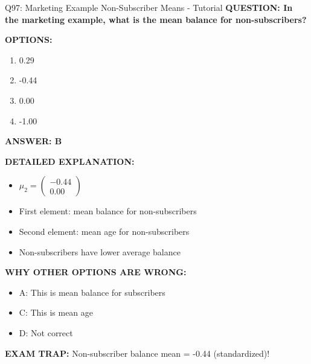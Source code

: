 \documentclass[8pt]{beamer}
\begin{document}
	\begin{frame}{Q97: Marketing Example Non-Subscriber Means - Tutorial}
		\fontsize{6.5}{7.5}\selectfont
		\textbf{QUESTION: In the marketing example, what is the mean balance for non-subscribers?}
		
		\vspace{0.1cm}
		\textbf{OPTIONS:}
		\begin{enumerate}
			\item 0.29
			\item -0.44
			\item 0.00
			\item -1.00
		\end{enumerate}
		
		\vspace{0.1cm}
		\textcolor{myblue}{\textbf{ANSWER: B}}
		
		\vspace{0.1cm}
		\textbf{DETAILED EXPLANATION:}
		\begin{itemize}
			\item $\mu_2 = \begin{pmatrix} -0.44 \\ 0.00 \end{pmatrix}$
			\item First element: mean balance for non-subscribers
			\item Second element: mean age for non-subscribers
			\item Non-subscribers have lower average balance
		\end{itemize}
		
		\vspace{0.1cm}
		\textcolor{myred}{\textbf{WHY OTHER OPTIONS ARE WRONG:}}
		\begin{itemize}
			\item \textcolor{myred}{A:} This is mean balance for subscribers
			\item \textcolor{myred}{C:} This is mean age
			\item \textcolor{myred}{D:} Not correct
		\end{itemize}
		
		\textcolor{myred}{\textbf{EXAM TRAP:}} Non-subscriber balance mean = \textcolor{myblue}{-0.44} (standardized)!
	\end{frame}
	
\end{document}

